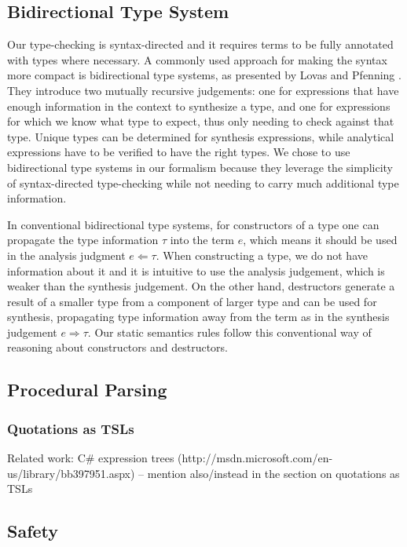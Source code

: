\subsection{Bidirectional Type System}
Our type-checking is syntax-directed and it requires terms to be fully annotated with types where necessary. A commonly used approach for making the syntax more compact is bidirectional type systems, as presented by Lovas and Pfenning \cite{Lovas08abidirectional}. They introduce two mutually recursive judgements: one for expressions that have enough information in the context to synthesize a type, and one for expressions for which we know what type to expect, thus only needing to check against that type. Unique types can be determined for synthesis expressions, while analytical expressions have to be verified to have the right types. We chose to use bidirectional type systems in our formalism because they leverage the simplicity of syntax-directed type-checking while not needing to carry much additional type information.

In conventional bidirectional type systems, for constructors of a type one can propagate the type information $\tau$
into the term $e$, which means it should be used in the analysis
judgment $e \Leftarrow \tau$. When constructing a type, we do not have information about it and it is intuitive to use the analysis judgement, which is weaker than the synthesis judgement. On the other hand, destructors generate a result of a smaller type from a component of larger type and can be used for synthesis, propagating type information away from the term as in the synthesis judgement $e \Rightarrow \tau$. Our static semantics rules follow this conventional way of reasoning about constructors and destructors.

\subsection{Procedural Parsing}
\subsubsection{Quotations as TSLs}
Related work: C\# expression trees (http://msdn.microsoft.com/en-us/library/bb397951.aspx) -- mention also/instead in the section on quotations as TSLs

\subsection{Safety}

